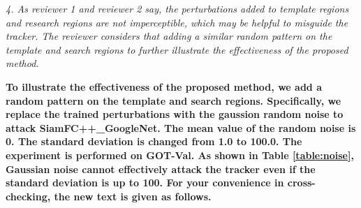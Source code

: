 \documentclass[12pt]{article}
\begin{document}
\textit{4. As reviewer 1 and reviewer 2 say, the perturbations added to template regions and research regions are not imperceptible, which may be helpful to misguide the tracker. The reviewer considers that adding a similar random pattern on the template and search regions to further illustrate the effectiveness of the proposed method.}

\textbf{To illustrate the effectiveness of the proposed method, we add a random pattern on the template and search regions. 
Specifically, we replace the trained perturbations with the gaussion random noise to attack SiamFC++\_GoogleNet. The mean value of the random noise is 0. The standard deviation is changed from 1.0 to 100.0. The experiment is performed on GOT-Val.
As shown in Table \ref{table:noise}, Gaussian noise cannot effectively attack the tracker even if the standard deviation is up to 100.
For your convenience in cross-checking, the new text is given as follows.
}

\end{document}
